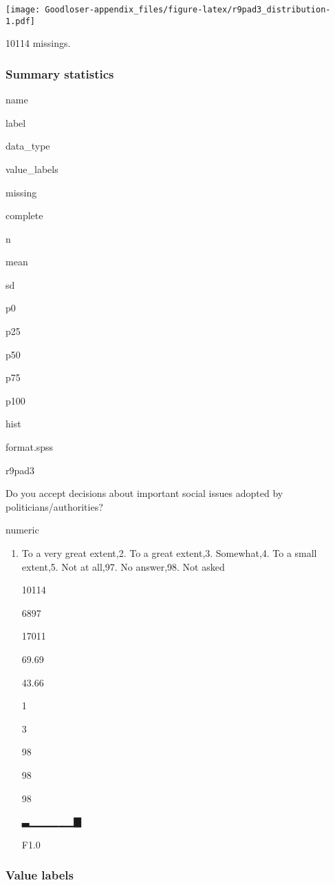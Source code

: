 \documentclass[]{book}
\providecommand{\tightlist}{%
  \setlength{\itemsep}{0pt}\setlength{\parskip}{0pt}}
\begin{document}
\texttt{[image: Goodloser-appendix\_files/figure-latex/r9pad3\_distribution-1.pdf]}

10114 missings.

\subsubsection{Summary statistics}\label{r9pad3_summary}

name

label

data\_type

value\_labels

missing

complete

n

mean

sd

p0

p25

p50

p75

p100

hist

format.spss

r9pad3

Do you accept decisions about important social issues adopted by
politicians/authorities?

numeric

\begin{enumerate}
\def\labelenumi{\arabic{enumi}.}
\tightlist
\item
  To a very great extent,2. To a great extent,3. Somewhat,4. To a small
  extent,5. Not at all,97. No answer,98. Not asked

  10114

  6897

  17011

  69.69

  43.66

  1

  3

  98

  98

  98

  ▃▁▁▁▁▁▁▇

  F1.0
\end{enumerate}

\subsubsection{Value labels}\label{r9pad3_labels}
\end{document}
